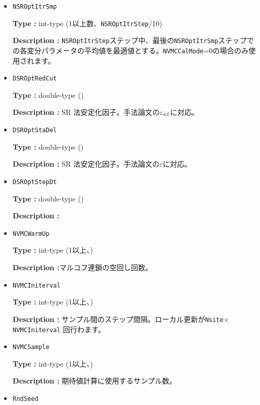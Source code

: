 \begin{itemize}
{\bf Type :} int-type (1以上、)

{\bf Description :} 
SR 法で最適化する場合の全ステップ数。\verb|NVMCCalMode|=0の場合のみ使用されます。
 
 \item  \verb|NSROptItrSmp|

{\bf Type :} int-type (1以上数、\verb|NSROptItrStep|/10)

{\bf Description :} \verb|NSROptItrStep|ステップ中、最後の\verb|NSROptItrSmp|ステップでの各変分パラメータの平均値を最適値とする。\verb|NVMCCalMode|=0の場合のみ使用されます。

\item   \verb|DSROptRedCut|
   
{\bf Type :} double-type ()

{\bf Description :} SR 法安定化因子。手法論文の$\varepsilon_{\rm wf}$に対応。

 \item  \verb|DSROptStaDel| 
   
 {\bf Type :} double-type ()

  {\bf Description :} SR 法安定化因子。手法論文の$\varepsilon$に対応。
     
\item \verb|DSROptStepDt|

{\bf Type :} double-type ()

{\bf Description :} 
 
\item \verb|NVMCWarmUp|

{\bf Type :} int-type (1以上、)

{\bf Description :}マルコフ連鎖の空回し回数。

\item \verb|NVMCIniterval|

{\bf Type :} int-type (1以上、)

{\bf Description :} サンプル間のステップ間隔。ローカル更新が\verb|Nsite|× \verb|NVMCIniterval| 回行わます。

\item \verb|NVMCSample|

{\bf Type :} int-type (1以上、)

{\bf Description :} 期待値計算に使用するサンプル数。

\item \verb|RndSeed|


\end{itemize}
